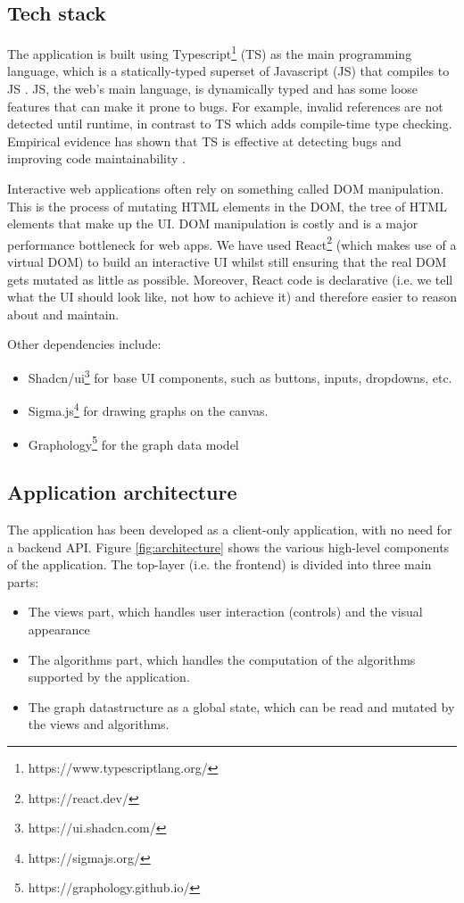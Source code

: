 \documentclass{l4proj}
\begin{document}
\subsection{Tech stack}

The application is built using Typescript\footnote{https://www.typescriptlang.org/} (TS) as the main programming language, which is a statically-typed superset of Javascript (JS) that compiles to JS \citep{typescript}.
JS, the web's main language, is dynamically typed and has some loose features that can make it prone to bugs. For example, invalid references are not detected until runtime, in contrast to TS which adds compile-time type checking.
Empirical evidence has shown that TS is effective at detecting bugs and improving code maintainability \citep{typescript_bugs_paper}.

Interactive web applications often rely on something called DOM manipulation. This is the process of mutating HTML elements in the DOM, the tree of HTML elements that make up the UI. DOM manipulation is costly and is a major performance bottleneck for web apps.
We have used React\footnote{https://react.dev/} (which makes use of a virtual DOM) to build an interactive UI whilst still ensuring that the real DOM gets mutated as little as possible.
Moreover, React code is declarative (i.e. we tell what the UI should look like, not how to achieve it) and therefore easier to reason about and maintain.

Other dependencies include:
\begin{itemize}
      \item Shadcn/ui\footnote{https://ui.shadcn.com/} for base UI components, such as buttons, inputs, dropdowns, etc.
      \item Sigma.js\footnote{https://sigmajs.org/} for drawing graphs on the canvas.
      \item Graphology\footnote{https://graphology.github.io/} for the graph data model
\end{itemize}

\subsection{Application architecture}
The application has been developed as a client-only application, with no need for a backend API. Figure \ref{fig:architecture} shows the various high-level components of the application. The top-layer (i.e. the frontend) is divided into three main parts:
\begin{itemize}
      \item The views part, which handles user interaction (controls) and the visual appearance
      \item The algorithms part, which handles the computation of the algorithms supported by the application.
      \item The graph datastructure as a global state, which can be read and mutated by the views and algorithms.
\end{itemize}
\end{document}
